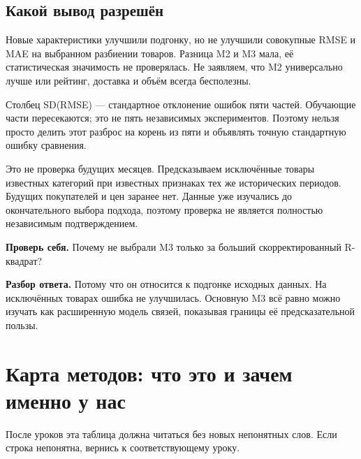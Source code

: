 \documentclass[12pt,a4paper]{article}
\newcommand{\check}[2]{\par\textbf{Проверь себя.} #1\par\textbf{Разбор ответа.} #2\par}
\begin{document}
\subsection{Какой вывод разрешён}

Новые характеристики улучшили подгонку, но не улучшили совокупные RMSE и MAE на выбранном разбиении товаров. Разница M2 и M3 мала, её статистическая значимость не проверялась. Не заявляем, что M2 универсально лучше или рейтинг, доставка и объём всегда бесполезны.

Столбец SD(RMSE) --- стандартное отклонение ошибок пяти частей. Обучающие части пересекаются; это не пять независимых экспериментов. Поэтому нельзя просто делить этот разброс на корень из пяти и объявлять точную стандартную ошибку сравнения.

Это не проверка будущих месяцев. Предсказываем исключённые товары известных категорий при известных признаках тех же исторических периодов. Будущих покупателей и цен заранее нет. Данные уже изучались до окончательного выбора подхода, поэтому проверка не является полностью независимым подтверждением.

\check{Почему не выбрали M3 только за больший скорректированный R-квадрат?}{Потому что он относится к подгонке исходных данных. На исключённых товарах ошибка не улучшилась. Основную M3 всё равно можно изучать как расширенную модель связей, показывая границы её предсказательной пользы.}
\clearpage
\section{Карта методов: что это и зачем именно у нас}

После уроков эта таблица должна читаться без новых непонятных слов. Если строка непонятна, вернись к соответствующему уроку.
\end{document}
